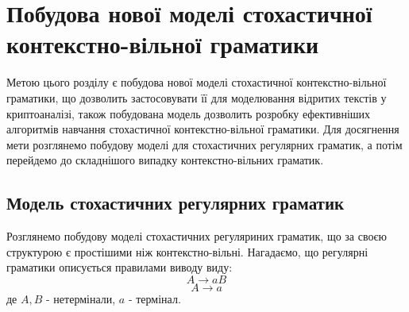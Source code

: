 \chapter{Побудова нової моделі стохастичної контекстно-вільної граматики}
\label{chap:theory}

Метою цього розділу є побудова нової моделі стохастичної контекстно-вільної граматики, що дозволить застосовувати її для моделювання відритих текстів у криптоаналізі, також побудована модель дозволить розробку ефективніших алгоритмів навчання стохастичної контекстно-вільної граматики. Для досягнення мети розглянемо побудову моделі для стохастичних регулярних граматик, а потім перейдемо до складнішого випадку контекстно-вільних граматик.

\section{Модель стохастичних регулярних граматик}
Розглянемо побудову моделі стохастичних регуляриних граматик, що за своєю структурою є простішими ніж контекстно-вільні.
Нагадаємо, що регулярні граматики описується правилами виводу виду:
$$ A \rightarrow a B $$
$$ A \rightarrow a $$
де $A,B$ - нетермінали, $a$ - термінал.

